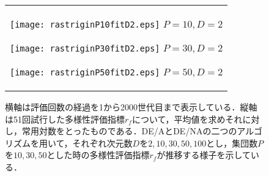 \documentclass[a4paper,11pt,oneside,openany]{jsbook}
\begin{document}
\newpage
\begin{figure}[htbp]
  \caption{横軸は評価回数の経過を1から2000世代目まで表示している．縦軸は51回試行した多様性評価指標$r_f$について，平均値を求めそれに対し，常用対数をとったものである．DE/AとDE/NAの二つのアルゴリズムを用いて，それぞれ次元数$D$を$2,10,30,50,100$とし，集団数$P$を$10,30,50$とした時の多様性評価指標$r_f$が推移する様子を示している．}
  \begin{center}
    \begin{tabular}{c}


      \begin{minipage}{0.33\hsize}
        \begin{center}
          \texttt{[image: rastriginP10fitD2.eps]}
          \hspace{1.2cm}$P=10, D=2
 $       \end{center}
      \end{minipage}

      \begin{minipage}{0.33\hsize}
        \begin{center}
          \texttt{[image: rastriginP30fitD2.eps]}
          \hspace{1.2cm}$P=30, D=2
 $       \end{center}
      \end{minipage}

      \begin{minipage}{0.33\hsize}
        \begin{center}
          \texttt{[image: rastriginP50fitD2.eps]}
          \hspace{1.2cm}$P=50, D=2
 $       \end{center}
      \end{minipage}
    \end{tabular}
  \end{center}
\end{figure}
\end{document}
